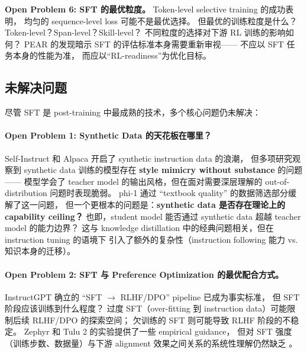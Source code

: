 \begin{openproblembox}
\textbf{Open Problem 6: SFT 的最优粒度。}
Token-level selective training 的成功表明，
均匀的 sequence-level loss 可能不是最优选择。
但最优的训练粒度是什么？
Token-level？Span-level？Skill-level？
不同粒度的选择对下游 RL 训练的影响如何？
PEAR 的发现暗示 SFT 的评估标准本身需要重新审视——
不应以 SFT 任务本身的性能为准，
而应以``RL-readiness''为优化目标。
\end{openproblembox}

\subsection{未解决问题}
\label{sec:t1-open}

尽管 SFT 是 post-training 中最成熟的技术，多个核心问题仍未解决：

\begin{openproblembox}
\paragraph{Open Problem 1: Synthetic Data 的天花板在哪里？}
Self-Instruct 和 Alpaca 开启了 synthetic instruction data 的浪潮，
但多项研究观察到 synthetic data 训练的模型存在 \textbf{style mimicry without substance} 的问题——
模型学会了 teacher model 的输出风格，但在面对需要深层理解的 out-of-distribution 问题时表现脆弱。
phi-1 通过 ``textbook quality'' 的数据筛选部分缓解了这一问题，
但一个更根本的问题是：\textbf{synthetic data 是否存在理论上的 capability ceiling？}
也即，student model 能否通过 synthetic data 超越 teacher model 的能力边界？
这与 knowledge distillation 中的经典问题相关，但在 instruction tuning 的语境下
引入了额外的复杂性（instruction following 能力 vs. 知识本身的迁移）。
\end{openproblembox}

\begin{openproblembox}
\paragraph{Open Problem 2: SFT 与 Preference Optimization 的最优配合方式。}
InstructGPT 确立的 ``SFT $\rightarrow$ RLHF/DPO'' pipeline 已成为事实标准，
但 SFT 阶段应该训练到什么程度？
过度 SFT（over-fitting 到 instruction data）可能限制后续 RLHF/DPO 的探索空间；
欠训练的 SFT 则可能导致 RLHF 阶段的不稳定。
Zephyr 和 Tulu 2 的实验提供了一些 empirical guidance，
但对 SFT 强度（训练步数、数据量）与下游 alignment 效果之间关系的系统性理解仍然缺乏
。
\end{openproblembox}


